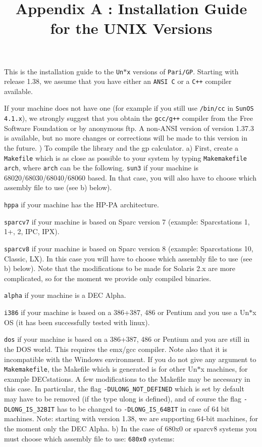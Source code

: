 \title{Appendix A : Installation Guide for the UNIX Versions}


This is the installation guide to the {\tt Un$*$x} versions of {\tt Pari/GP}.
Starting with release 1.38, we assume that you have either an {\tt ANSI C}
or a {\tt C++} compiler available.

If your machine does not have one (for example if you still use {\tt /bin/cc}
in {\tt SunOS 4.1.x}), we strongly suggest that you obtain the {\tt gcc/g++}
compiler from the Free Software Foundation or by anonymous ftp. A non-ANSI
version of version 1.37.3 is available, but no more changes or corrections
will be made to this version in the future.
) To compile the library and the gp calculator.
\smallskip
   a) First, create a {\tt Makefile} which is as close as possible to your
      system by typing {\tt Makemakefile arch}, where {\tt arch} can be the
      following.
\smallskip
{\tt sun3} if your machine is 68020/68030/68040/68060 based. In that case, you 
        will also have to choose which assembly file to use (see b) below).

{\tt hppa} if your machine has the HP-PA architecture.

{\tt sparcv7} if your machine is based on Sparc version 7 (example: 
       Sparcstations 1, 1+, 2, IPC, IPX).

{\tt sparcv8} if your machine is based on Sparc version 8 (example:
        Sparcstations 10, Classic, LX). In this case you will have to choose
        which assembly file to use (see b) below). Note that the modifications
        to be made for Solaris 2.x are more complicated, so for the moment we
        provide	only compiled binaries.

{\tt alpha} if your machine is a DEC Alpha.

{\tt i386} if your machine is based on a 386+387, 486 or Pentium and you use a
        Un$*$x OS (it has been successfully tested with linux).

{\tt dos} if your machine is based on a 386+387, 486 or Pentium and you are
        still in the DOS world. This requires the emx/gcc compiler. Note also
        that it is incompatible with the Windows environment.
\smallskip
	If you do not give any argument to {\tt Makemakefile}, the Makefile
        which is generated is for other Un$*$x machines, for example 
	DECstations. A few modifications to the Makefile may be necessary in
	this case. In particular, the flag {\tt -DULONG\_NOT\_DEFINED} which
	is set by default may have to be removed (if the type ulong is 
	defined), and of course the flag {\tt -DLONG\_IS\_32BIT} has to be
	changed to {\tt -DLONG\_IS\_64BIT} in case of 64 bit machines.
\smallskip
	Note: starting with version 1.38, we are supporting
	64-bit machines, for the moment only the DEC Alpha.
\medskip
   b) In the case of 680x0 or sparcv8 systems you must choose which assembly
      file to use:
\smallskip
{\tt 680x0} systems:
  
